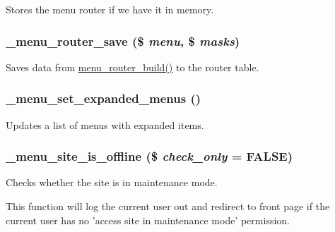 \label{group__menu_ga02af3d3800722e9ff5be36485b655905}
Stores the menu router if we have it in memory. \hypertarget{group__menu_gaa7e7e12f5c89718ac147c0e166458135}{
\subsubsection[{\_\-menu\_\-router\_\-save}]{\setlength{\rightskip}{0pt plus 5cm}\_\-menu\_\-router\_\-save (\$ {\em menu}, \/  \$ {\em masks})}}
\label{group__menu_gaa7e7e12f5c89718ac147c0e166458135}
Saves data from \hyperlink{group__menu_ga1f6713b93173302fb29d7bc9578b7530}{menu\_\-router\_\-build()} to the router table. \hypertarget{group__menu_ga08212e3890c64045fcf6b44032b343a0}{
\subsubsection[{\_\-menu\_\-set\_\-expanded\_\-menus}]{\setlength{\rightskip}{0pt plus 5cm}\_\-menu\_\-set\_\-expanded\_\-menus ()}}
\label{group__menu_ga08212e3890c64045fcf6b44032b343a0}
Updates a list of menus with expanded items. \hypertarget{group__menu_ga1bfe1a44b1867b0c02a241b6cc43e50c}{
\subsubsection[{\_\-menu\_\-site\_\-is\_\-offline}]{\setlength{\rightskip}{0pt plus 5cm}\_\-menu\_\-site\_\-is\_\-offline (\$ {\em check\_\-only} = {\ttfamily FALSE})}}
\label{group__menu_ga1bfe1a44b1867b0c02a241b6cc43e50c}
Checks whether the site is in maintenance mode.

This function will log the current user out and redirect to front page if the current user has no 'access site in maintenance mode' permission.


